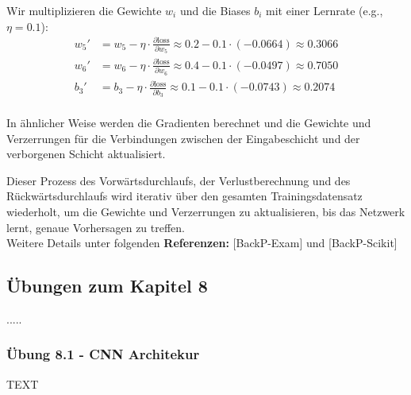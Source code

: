 \documentclass[12pt]{article}
\begin{document}
Wir multiplizieren die Gewichte $w_i$ und die Biases $b_i$ mit einer Lernrate (e.g., $\eta = 0.1$):\\

\[
\begin{aligned}
w_5' &= w_5 - \eta \cdot \frac{\partial \text{loss}}{\partial w_5} \approx 0.2 - 0.1 \cdot (-0.0664) \approx 0.3066 \\
w_6' &= w_6 - \eta \cdot \frac{\partial \text{loss}}{\partial w_6} \approx 0.4 - 0.1 \cdot (-0.0497) \approx 0.7050 \\
b_3' &= b_3 - \eta \cdot \frac{\partial \text{loss}}{\partial b_3} \approx 0.1 - 0.1 \cdot (-0.0743) \approx 0.2074 \\
\end{aligned}
\]

In ähnlicher Weise werden die Gradienten berechnet und die Gewichte und Verzerrungen für die Verbindungen zwischen der Eingabeschicht und der verborgenen Schicht aktualisiert.

Dieser Prozess des Vorwärtsdurchlaufs, der Verlustberechnung und des Rückwärtsdurchlaufs wird iterativ über den gesamten Trainingsdatensatz wiederholt, um die Gewichte und Verzerrungen zu aktualisieren, bis das Netzwerk lernt, genaue Vorhersagen zu treffen.\\[0.2cm]

Weitere Details unter folgenden \textbf{Referenzen:} [BackP-Exam] und [BackP-Scikit] 
{\color{red}{*******************************************************************\\ ****************  Ende Anpassung für diese Subsection ************** \\
********************************************************************\\}}

 
\newpage

\subsection{Übungen zum Kapitel 8}

{\color{red}{*******************************************************************\\ 
ab hier bis Ende der Übungen sind die Folien der Vorlesung ML  zu nutzen und diese sind in Latex umzusetzen\\
********************************************************************\\}}  
.....\\
\subsubsection{Übung 8.1 - CNN Architekur}
TEXT\\
\end{document}
